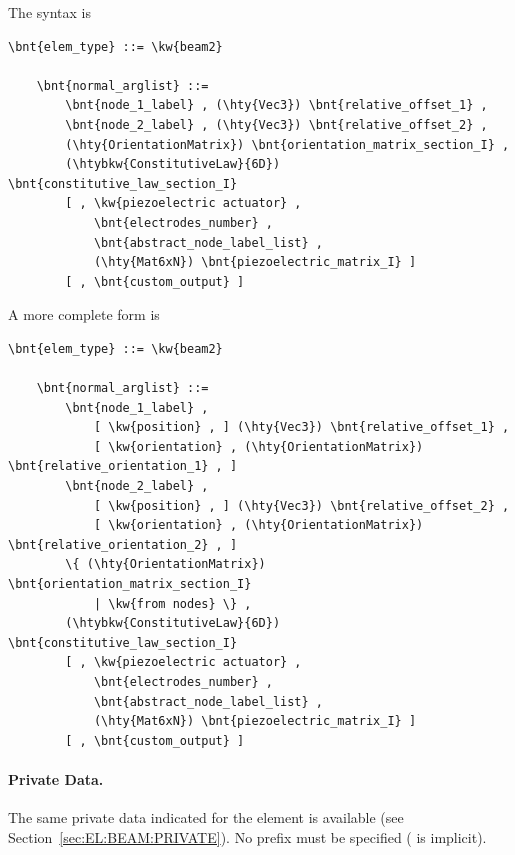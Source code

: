 The syntax is
\begin{Verbatim}[commandchars=\\\{\}]
    \bnt{elem_type} ::= \kw{beam2}

    \bnt{normal_arglist} ::=
        \bnt{node_1_label} , (\hty{Vec3}) \bnt{relative_offset_1} ,
        \bnt{node_2_label} , (\hty{Vec3}) \bnt{relative_offset_2} ,
        (\hty{OrientationMatrix}) \bnt{orientation_matrix_section_I} ,
        (\htybkw{ConstitutiveLaw}{6D}) \bnt{constitutive_law_section_I}
        [ , \kw{piezoelectric actuator} , 
            \bnt{electrodes_number} ,
            \bnt{abstract_node_label_list} ,
            (\hty{Mat6xN}) \bnt{piezoelectric_matrix_I} ]
        [ , \bnt{custom_output} ]
\end{Verbatim}

A more complete form is
\begin{Verbatim}[commandchars=\\\{\}]
    \bnt{elem_type} ::= \kw{beam2}

    \bnt{normal_arglist} ::=
        \bnt{node_1_label} ,
            [ \kw{position} , ] (\hty{Vec3}) \bnt{relative_offset_1} ,
            [ \kw{orientation} , (\hty{OrientationMatrix}) \bnt{relative_orientation_1} , ]
        \bnt{node_2_label} ,
            [ \kw{position} , ] (\hty{Vec3}) \bnt{relative_offset_2} ,
            [ \kw{orientation} , (\hty{OrientationMatrix}) \bnt{relative_orientation_2} , ]
        \{ (\hty{OrientationMatrix}) \bnt{orientation_matrix_section_I}
            | \kw{from nodes} \} ,
        (\htybkw{ConstitutiveLaw}{6D}) \bnt{constitutive_law_section_I}
        [ , \kw{piezoelectric actuator} , 
            \bnt{electrodes_number} ,
            \bnt{abstract_node_label_list} ,
            (\hty{Mat6xN}) \bnt{piezoelectric_matrix_I} ]
        [ , \bnt{custom_output} ]
\end{Verbatim}

\paragraph{Private Data.}
The same private data indicated for the  element is available
(see Section~\ref{sec:EL:BEAM:PRIVATE}).
No prefix must be specified ( is implicit).


